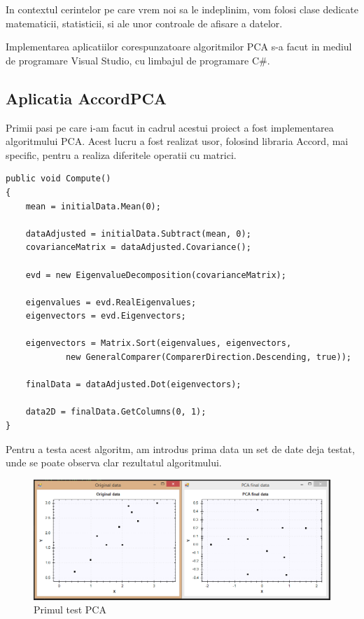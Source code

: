 \documentclass[12pt,oneside]{article}
\begin{document}
In contextul cerintelor pe care vrem noi sa le indeplinim, vom folosi clase dedicate matematicii, statisticii, si ale unor controale de afisare a datelor.

Implementarea aplicatiilor corespunzatoare algoritmilor PCA s-a facut in mediul de programare Visual Studio, cu limbajul de programare C\#.

\subsection{Aplicatia AccordPCA}
Primii pasi pe care i-am facut in cadrul acestui proiect a fost implementarea algoritmului PCA. Acest lucru a fost realizat usor, folosind libraria Accord, mai specific, pentru a realiza diferitele operatii cu matrici. \cite{accord_pca}

\begin{lstlisting}[basicstyle=\footnotesize]
public void Compute()
{
	mean = initialData.Mean(0);

	dataAdjusted = initialData.Subtract(mean, 0);
	covarianceMatrix = dataAdjusted.Covariance();

	evd = new EigenvalueDecomposition(covarianceMatrix);

	eigenvalues = evd.RealEigenvalues;
	eigenvectors = evd.Eigenvectors;

	eigenvectors = Matrix.Sort(eigenvalues, eigenvectors,
			new GeneralComparer(ComparerDirection.Descending, true));

	finalData = dataAdjusted.Dot(eigenvectors);

	data2D = finalData.GetColumns(0, 1);
}
\end{lstlisting}

Pentru a testa acest algoritm, am introdus prima data un set de date deja testat, unde se poate observa clar rezultatul algoritmului.\cite{data_reduction}
\begin{figure}[H]
\centering
\caption{Primul test PCA}
\includegraphics[width=\linewidth]{Test1}
\end{figure}
\newpage
\end{document}
